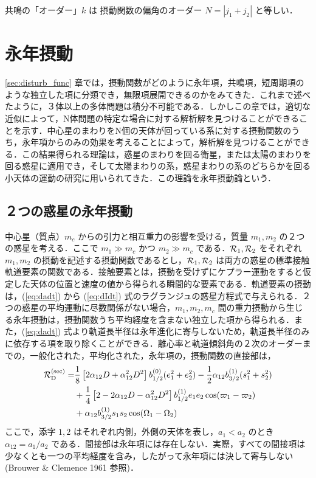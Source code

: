 \documentclass[11pt,a4paper,oneside,onecolumn]{jarticle}
\begin{document}
共鳴の「オーダー」$k$ は 摂動関数の偏角のオーダー $N = |j_1 + j_2|$ と等しい．

\section{永年摂動}
\ref{sec:disturb_func} 章では，摂動関数がどのように永年項，共鳴項，短周期項のような独立した項に分類でき，無限項展開できるのかをみてきた．これまで述べたように，３体以上の多体問題は積分不可能である．しかしこの章では，適切な近似によって，N体問題の特定な場合に対する解析解を見つけることができることを示す．中心星のまわりをN個の天体が回っている系に対する摂動関数のうち，永年項からのみの効果を考えることによって，解析解を見つけることができる．この結果得られる理論は，惑星のまわりを回る衛星，または太陽のまわりを回る惑星に適用でき，そして太陽まわりの系，惑星まわりの系のどちらかを回る小天体の運動の研究に用いられてきた．この理論を永年摂動論という．

\subsection{２つの惑星の永年摂動 \label{sec:2planet}}
中心星（質点）$m_c$ からの引力と相互重力の影響を受ける，質量 $m_1, m_2$ の２つの惑星を考える．ここで $m_1 \gg m_c$ かつ $m_2 \gg m_c$ である．${\cal R}_1, {\cal R}_2$ をそれぞれ $m_1, m_2$ の摂動を記述する摂動関数であるとし，${\cal R}_1, {\cal R}_2$ は両方の惑星の標準接触軌道要素の関数である．接触要素とは，摂動を受けずにケプラー運動をすると仮定した天体の位置と速度の値から得られる瞬間的な要素である．軌道要素の摂動は，(\ref{eq:dadt}) から (\ref{eq:dIdt}) 式のラグランジュの惑星方程式で与えられる．２つの惑星の平均運動に尽数関係がない場合，$m_1, m_2, m_c$ 間の重力摂動から生じる永年摂動は，摂動関数うち平均経度を含まない独立した項から得られる．また，(\ref{eq:dadt}) 式より軌道長半径は永年進化に寄与しないため，軌道長半径のみに依存する項を取り除くことができる．離心率と軌道傾斜角の２次のオーダーまでの，一般化された，平均化された，永年項の，摂動関数の直接部は，
\begin{equation}
\begin{split}
{\cal R}_{\rm D}^{\rm (sec)} = & \frac{1}{8} \left[ 2 \alpha_{12} D + \alpha_{12}^2 D^2 \right] b_{1/2}^{(0)} (e_1^2 + e_2^2) - \frac{1}{2} \alpha_{12} b_{3/2}^{(1)} (s_1^2 + s_2^2) \\
& + \frac{1}{4} \left[ 2 - 2 \alpha_{12} D - \alpha_{12}^2 D^2 \right] b_{1/2}^{(1)} e_1 e_2 \cos (\varpi_1 - \varpi_2) \\
& + \alpha_{12} b_{3/2}^{(1)} s_1 s_2 \cos (\Omega_1 - \Omega_2) \\
\end{split} \label{}
\end{equation}
ここで，添字 $1,2$ はそれぞれ内側，外側の天体を表し，$a_1 < a_2$ のとき $\alpha_{12} = a_1 / a_2$ 
である．間接部は永年項には存在しない．実際，すべての間接項は少なくとも一つの平均経度を含み，したがって永年項には決して寄与しない (Brouwer \& Clemence 1961 参照)．
\end{document}
